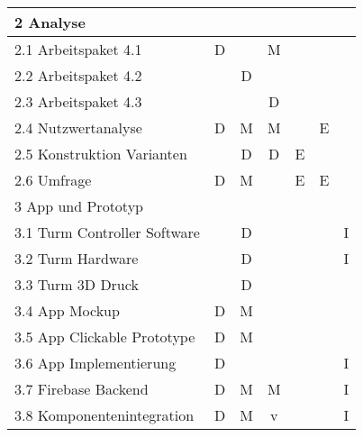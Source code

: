 \begin{longtable}{|l|c|c|c|c|c|c|}
  \multicolumn{7}{|l|}{2 Analyse}                                                                                               \\ \hline
  2.1 Arbeitspaket 4.1                   & D              &             & M          &          &               &               \\ \hline
  2.2 Arbeitspaket 4.2                   &                & D           &            &          &               &               \\ \hline
  2.3 Arbeitspaket 4.3                   &                &             & D          &          &               &               \\ \hline
  2.4 Nutzwertanalyse                    & D              & M           & M          &          & E             &               \\ \hline
  2.5 Konstruktion Varianten             &                & D           & D          & E        &               &               \\ \hline
  2.6 Umfrage                            & D              & M           &            & E        & E             &               \\ \hline

  \multicolumn{7}{|l|}{3 App und Prototyp }                                                                                     \\ \hline
  3.1 Turm Controller Software           &                & D           &            &          &               & I             \\ \hline
  3.2 Turm Hardware                      &                & D           &            &          &               & I             \\ \hline
  3.3 Turm 3D Druck                      &                & D           &            &          &               &               \\ \hline
  3.4 App Mockup                         & D              & M           &            &          &               &               \\ \hline
  3.5 App Clickable Prototype            & D              & M           &            &          &               &               \\ \hline
  3.6 App Implementierung                & D              &             &            &          &               & I             \\ \hline
  3.7 Firebase Backend                   & D              & M           & M          &          &               & I             \\ \hline
  3.8 Komponentenintegration             & D              & M           & v          &          &               & I             \\ \hline


\end{longtable}
